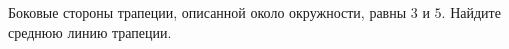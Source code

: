 \begin{ex}
	\begin{condition}
		Боковые стороны трапеции, описанной около окружности, равны \( 3  \) и \(  5 \). Найдите среднюю линию трапеции.
	\end{condition}
\end{ex}